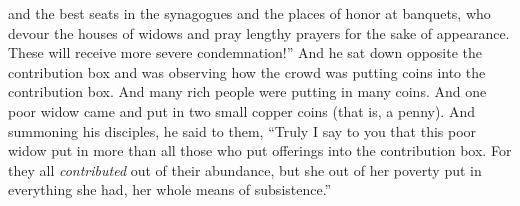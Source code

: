 \begin{biblechapter}
\verse and the best seats in the synagogues and the places of honor at banquets,
\verse who devour the houses of widows and pray lengthy prayers for the sake of appearance. These will receive more severe condemnation!”
 And he sat down opposite the contribution box and was observing how the crowd was putting coins into the contribution box. And many rich people were putting in many coins.
\verse And one poor widow came and put in two small copper coins (that is, a penny).
\verse And summoning his disciples, he said to them, “Truly I say to you that this poor widow put in more than all those who put offerings into the contribution box.
\verse For they all \textit{contributed} out of their abundance, but she out of her poverty put in everything she had, her whole means of subsistence.”
\end{biblechapter}

